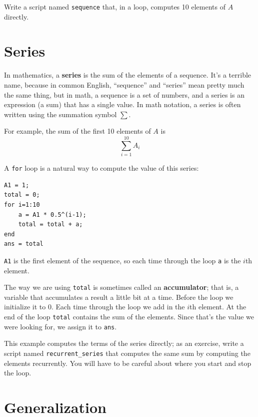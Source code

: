 \documentclass[
]{book}
\begin{document}
\begin{ex}
Write a
script named {\tt sequence} that, in a loop, 
computes 10 elements of $A$ directly.
\end{ex}


\section{Series}
\label{sect:series}

In mathematics, a {\bf series} is the sum of the elements of
a sequence.  It's a terrible name, because in common English,
``sequence'' and ``series'' mean pretty much the same thing, but in
math, a sequence is a set of numbers, and a series is an expression
(a sum) that has a single value.  In math notation, a series
is often written using the summation symbol $\sum$.

For example, the sum of the first 10 elements of $A$ is
\begin{equation}
\sum_{i=1}^{10} A_i
\end{equation}

A {\tt for} loop is a natural way to compute the value of this
series:

\begin{verbatim}
A1 = 1;
total = 0;
for i=1:10
    a = A1 * 0.5^(i-1);
    total = total + a;
end
ans = total
\end{verbatim}

{\tt A1} is the first element of the sequence, so each time
through the loop {\tt a} is the $i$th element.

The way we are using {\tt total} is sometimes called an {\bf
accumulator}; that is, a variable that accumulates a result a little
bit at a time.  Before the loop we initialize it to 0.  Each time
through the loop we add in the $i$th element.  At the end of the loop
{\tt total} contains the sum of the elements.  Since that's the value
we were looking for, we assign it to {\tt ans}.

\begin{ex}
This example computes the terms of the series directly; as
an exercise, write a script named {\tt recurrent\_series} that computes
the same sum by computing the elements recurrently.  You will
have to be careful about where you start and stop the loop.
\end{ex}


\section{Generalization}
\end{document}
